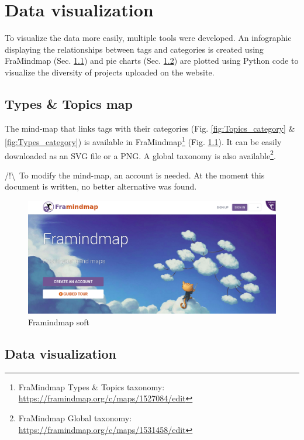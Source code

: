 \chapter{Data visualization}\label{chap:data}

To visualize the data more easily, multiple tools were developed. An infographic displaying the relationships between tags and categories is created using FraMindmap (Sec. \ref{sec:map}) and pie charts (Sec. \ref{sec:camembert}) are plotted using Python code to visualize the diversity of projects uploaded on the website. 

\section{Types \& Topics map}\label{sec:map}

The mind-map that links tags with their categories (Fig. \ref{fig:Topics_category} \& \ref{fig:Types_category}) is available in FraMindmap\footnote{FraMindmap Types \& Topics taxonomy: \href{https://framindmap.org/c/maps/1527084/edit}{https://framindmap.org/c/maps/1527084/edit}} (Fig. \ref{fig:framamindmap}). It can be easily downloaded as an SVG file or a PNG. A global taxonomy is also available\footnote{FraMindmap Global taxonomy: \href{https://framindmap.org/c/maps/1531458/edit}{https://framindmap.org/c/maps/1531458/edit}}.

/!\textbackslash \ To modify the mind-map, an account is needed. At the moment this document is written, no better alternative was found.

\begin{figure}[h!]
    \centering
    \includegraphics[width=\linewidth]{Image/Data visualization/framamindmap.png}
    \caption{Framindmap soft}
    \label{fig:framamindmap}
\end{figure}

\newpage
\section{Data visualization}\label{sec:camembert}

